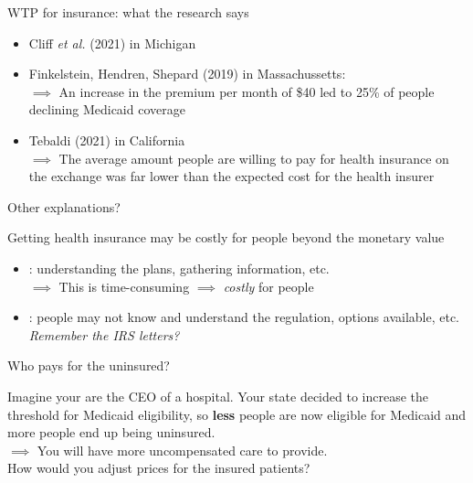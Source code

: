 \begin{frame}{WTP for insurance: what the research says}

    \begin{itemize}

        \item Cliff \textit{et al.} (2021) in Michigan\\
        \vspace{3mm}

        \item Finkelstein, Hendren, Shepard (2019) in Massachussetts:\\
        $\implies$ An increase in the premium per month of \$40 led to 25\% of people declining Medicaid coverage \\
        \vspace{3mm}

        \item Tebaldi (2021) in California\\
        $\implies$ The average amount people are willing to pay for health insurance on the exchange was far lower than the expected cost for the health insurer
    \end{itemize}

\end{frame}
\begin{frame}{Other explanations?}

    Getting health insurance may be costly for people beyond the monetary value
    \begin{itemize}
        \item {}: understanding the plans, gathering information, etc.\\
        $\implies$ This is time-consuming $\implies$ \textit{costly} for people
        \item {}: people may not know and understand the regulation, options available, etc.\\
        \textit{Remember the IRS letters?}
    \end{itemize}
\end{frame}
\begin{frame}{Who pays for the uninsured?}

    Imagine your are the CEO of a hospital.
    Your state decided to increase the threshold for Medicaid eligibility,
    so \textbf{less} people are now eligible for Medicaid and more people end up being uninsured.\\
    $\implies$ You will have more uncompensated care to provide.\\
    How would you adjust prices for the insured patients?

\end{frame}
